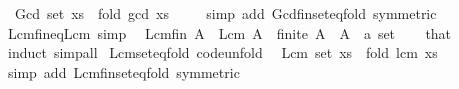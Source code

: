 \begin{isabellebody}
\ \ {\isachardoublequoteopen}Gcd\ {\isacharparenleft}{\kern0pt}set\ xs{\isacharparenright}{\kern0pt}\ {\isacharequal}{\kern0pt}\ fold\ gcd\ xs\ {}{\isachardoublequoteclose}\isanewline
%
\isadelimproof
\ \ %
\endisadelimproof
%
\isatagproof
{}\isamarkupfalse%
\ {\isacharparenleft}{\kern0pt}simp\ add{\isacharcolon}{\kern0pt}\ Gcd{\isacharunderscore}{\kern0pt}fin{\isachardot}{\kern0pt}set{\isacharunderscore}{\kern0pt}eq{\isacharunderscore}{\kern0pt}fold\ {\isacharbrackleft}{\kern0pt}symmetric{\isacharbrackright}{\kern0pt}{\isacharparenright}{\kern0pt}%
\endisatagproof
{\isafoldproof}%
%
\isadelimproof
\isanewline
%
\endisadelimproof
\isanewline
{}\isamarkupfalse%
\ Lcm{\isacharunderscore}{\kern0pt}fin{\isacharunderscore}{\kern0pt}eq{\isacharunderscore}{\kern0pt}Lcm\ {\isacharbrackleft}{\kern0pt}simp{\isacharbrackright}{\kern0pt}{\isacharcolon}{\kern0pt}\isanewline
\ \ {\isachardoublequoteopen}Lcm\isactrlsub f\isactrlsub i\isactrlsub n\ A\ {\isacharequal}{\kern0pt}\ Lcm\ A{\isachardoublequoteclose}\ \ {\isachardoublequoteopen}finite\ A{\isachardoublequoteclose}\ \ A\ {\isacharcolon}{\kern0pt}{\isacharcolon}{\kern0pt}\ {\isachardoublequoteopen}{\isacharprime}{\kern0pt}a\ set{\isachardoublequoteclose}\isanewline
%
\isadelimproof
\ \ %
\endisadelimproof
%
\isatagproof
{}\isamarkupfalse%
\ that\ \isamarkupfalse%
\ induct\ simp{\isacharunderscore}{\kern0pt}all%
\endisatagproof
{\isafoldproof}%
%
\isadelimproof
\isanewline
%
\endisadelimproof
\isanewline
{}\isamarkupfalse%
\ Lcm{\isacharunderscore}{\kern0pt}set{\isacharunderscore}{\kern0pt}eq{\isacharunderscore}{\kern0pt}fold\ {\isacharbrackleft}{\kern0pt}code{\isacharunderscore}{\kern0pt}unfold{\isacharbrackright}{\kern0pt}{\isacharcolon}{\kern0pt}\isanewline
\ \ {\isachardoublequoteopen}Lcm\ {\isacharparenleft}{\kern0pt}set\ xs{\isacharparenright}{\kern0pt}\ {\isacharequal}{\kern0pt}\ fold\ lcm\ xs\ {}{\isachardoublequoteclose}\isanewline
%
\isadelimproof
\ \ %
\endisadelimproof
%
\isatagproof
{}\isamarkupfalse%
\ {\isacharparenleft}{\kern0pt}simp\ add{\isacharcolon}{\kern0pt}\ Lcm{\isacharunderscore}{\kern0pt}fin{\isachardot}{\kern0pt}set{\isacharunderscore}{\kern0pt}eq{\isacharunderscore}{\kern0pt}fold\ {\isacharbrackleft}{\kern0pt}symmetric{\isacharbrackright}{\kern0pt}{\isacharparenright}{\kern0pt}%
\endisatagproof
{\isafoldproof}%
%
\isadelimproof
\isanewline
%
\endisadelimproof
\isanewline
{}\isamarkupfalse%
%
\isadelimdocument
%
\endisadelimdocument

\end{isabellebody}
